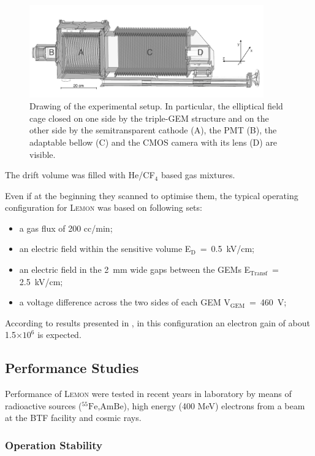 \documentclass[review]{elsarticle}
\newcommand{\fe}{\ensuremath{^{55}\textrm{Fe}}\xspace}
\newcommand{\ambe}{\ensuremath{\textrm{Am} \textrm{Be}}\xspace}
\newcommand{\lemon}{{\textsc{Lemon}}\xspace}
\newcommand{\Ed}  {E$_{\mathrm{D}}$\xspace}
\newcommand{\Et}  {E$_{\mathrm{Transf}}$\xspace}
\newcommand{\Vg}  {V$_{\mathrm{GEM}}$\xspace}
\begin{document}
\begin{figure}[ht]
\centering
\includegraphics[width=0.9\textwidth]{lemon.png}
\caption{Drawing of the experimental setup. In particular, the elliptical field cage closed on one side by the triple-GEM structure and on the other side by the semitransparent cathode (A), the PMT (B), the adaptable bellow (C) and the CMOS camera with its lens (D) are visible.} \label{fig:lemon}
\end{figure}

The drift volume was filled with He/CF$_4$ based gas mixtures. 


Even if at the beginning they scanned to optimise them, the typical operating configuration for \lemon was based on following sets: 
\begin{itemize}
    \item a gas flux of 200 cc/min;
    \item an electric field within the sensitive volume \Ed~=~0.5~kV/cm;
    \item an electric field in the 2~mm wide gaps between the GEMs \Et~= 2.5~kV/cm;
    \item a voltage difference across the two sides of each GEM \Vg~=~460~V;
\end{itemize}

According to results presented in \cite{bib:roby}, in this configuration an electron gain of about 1.5$\times 10^6$ is expected.

\subsection{Performance Studies}

Performance of \lemon were tested in recent years in laboratory by means of radioactive sources (\fe,\ambe), high energy (400 MeV) electrons from a beam at the BTF facility \cite{bib:btf1,bib:btf2} and cosmic rays.

\subsubsection{Operation Stability}
\end{document}
